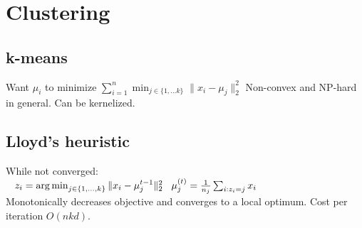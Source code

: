 \section*{Clustering}
\subsection*{k-means}
Want $\mu_i$ to minimize $\sum_{i=1}^n \min_{j\in\{1,...k\}}\|x_i-\mu_j\|_2^2$
Non-convex and NP-hard in general. Can be kernelized.

\subsection*{Lloyd's heuristic}
While not converged:\\
$\hspace*{3mm}z_i = \operatorname*{arg\,min}_{j\in\{1,...,k\}}\|x_i - \mu_j^{t-1}\|_2^2\\
\hspace*{3mm}\mu_j^{(t)} = \frac{1}{n_j}\sum_{i:z_i=j}x_i$\\
Monotonically decreases objective and converges to a local 
optimum. Cost per iteration $O(nkd)$.
